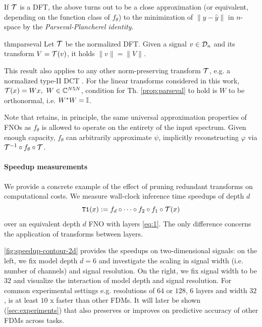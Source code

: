 %
If $\mathcal{T}$ is a DFT, the above turns out to be a close approximation (or equivalent, depending on the function class of $f_\theta$) to the minimization of $\|y - \hat{y}\|$ in $n$-space by the \textit{Parseval-Plancherel identity}.


\begin{restatable}{thm}{parseval} \label{prop:parseval}
    Let $\mathcal{T}$ be the normalized DFT. Given a signal $v\in\mathcal{D}_n$ and its transform $V = \mathcal{T}(v)$, it holds $\|v\| = \|V\|$.
\end{restatable}
%
This result also applies to any other norm-preserving transform $\mathcal{T}$, e.g.  a normalized type-\textsc{II} DCT \citep[pp. 679]{oppenheim1999discrete}. For the linear transforms considered in this work, $\mathcal{T}(x) = Wx,~W\in\mathbb{C}^{N5 N}$, condition for Th. \ref{prop:parseval} to hold is $W$ to be orthonormal, i.e. $W^*W = \mathbb{I}$.
%


Note that \ourmethod{} retains, in principle, the same universal approximation properties of FNOs \citep{kovachki2021universal} as $f_\theta$ is allowed to operate on the entirety of the input spectrum. Given enough capacity, $f_\theta$ can arbitrarily approximate $\psi$, implicitly reconstructing $\varphi$ via $\mathcal{T}^{-1}\circ f_\theta\circ\mathcal{T}$.

%
\paragraph{Speedup measurements}
%
We provide a concrete example of the effect of pruning redundant transforms on computational costs. We measure wall-clock inference time speedups of depth $d$ \ourmethod{}
\[
\text{$\tt{T1}${}}(x):= f_{d} \circ \cdots\circ f_2 \circ f_1 \circ \mathcal{T}(x)
\]
over an equivalent depth $d$ FNO with layers \eqref{eq:1}. The only difference concerns the application of transforms between layers. 

 \cref{fig:speedup-contour-2d} provides the speedups on two-dimensional signals: on the left, we fix model depth $d=6$ and investigate the scaling in signal width (i.e. number of channels) and signal resolution. On the right, we fix signal width to be $32$ and visualize the interaction of model depth and signal resolution. For common experimental settings e.g. resolutions of $64$ or $128$, $6$ layers and width $32$, \ourmethod{} is at least $10$ x faster than other FDMs. It will later be shown (\cref{sec:experiments}) that \ourmethod{} also preserves or improves on predictive accuracy of other FDMs across tasks.

